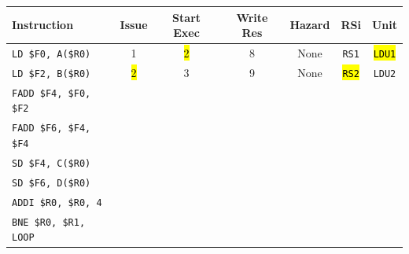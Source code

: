 \begin{enumerate}
    \begin{table}[!htp]
        \centering
        \begin{adjustbox}{width={\textwidth},totalheight={\textheight},keepaspectratio}
        \begin{tabular}{@{} l c c c c c c @{}}
            \toprule
            \textbf{Instruction} & \textbf{Issue} & \textbf{Start Exec} & \textbf{Write Res} & \textbf{Hazard} & \textbf{RSi} & \textbf{Unit} \\
            \midrule
            \texttt{LD \$F0, A(\$R0)}       & 1 & \hl{2} & 8 & None  & \texttt{RS1}   & \hl{\texttt{LDU1}}  \\ [.5em]
            \texttt{LD \$F2, B(\$R0)}       & \hl{2} & 3 & 9 & None  & \hl{\texttt{RS2}}   & \texttt{LDU2}  \\ [.5em]
            \texttt{FADD \$F4, \$F0, \$F2}  &   &   &   &       &       &       \\ [.5em]
            \texttt{FADD \$F6, \$F4, \$F4}  &   &   &   &       &       &       \\ [.5em]
            \texttt{SD \$F4, C(\$R0)}       &   &   &   &       &       &       \\ [.5em]
            \texttt{SD \$F6, D(\$R0)}       &   &   &   &       &       &       \\ [.5em]
            \texttt{ADDI \$R0, \$R0, 4}     &   &   &   &       &       &       \\ [.5em]
            \texttt{BNE \$R0, \$R1, LOOP}   &   &   &   &       &       &       \\
            \bottomrule
        \end{tabular}
        \end{adjustbox}
    \end{table}
    

\end{enumerate}
